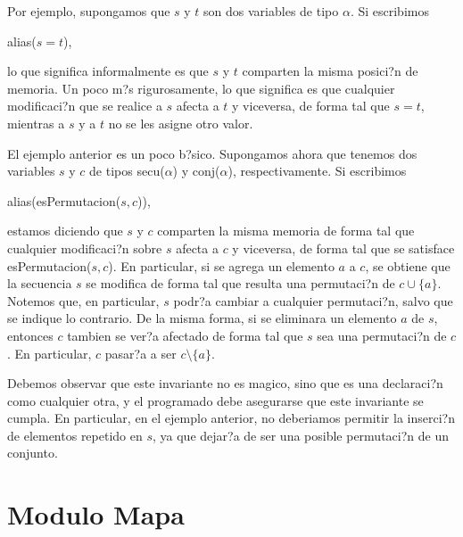 \documentclass[a4paper,10pt]{article}
\begin{document}
Por ejemplo, supongamos que $s$ y $t$ son dos variables de tipo $\alpha$.  Si escribimos
\begin{center}
  alias($s = t$),
\end{center}
lo que significa informalmente es que $s$ y $t$ comparten la misma posici?n de memoria.  Un poco m?s rigurosamente, lo que significa es que cualquier modificaci?n que se realice a $s$ afecta a $t$ y viceversa, de forma tal que $s = t$, mientras a $s$ y a $t$ no se les asigne otro valor.

El ejemplo anterior es un poco b?sico.  Supongamos ahora que tenemos dos variables $s$ y $c$ de tipos secu($\alpha$) y conj($\alpha$), respectivamente.  Si escribimos
\begin{center}
  alias(esPermutacion($s, c$)),
\end{center}
estamos diciendo que $s$ y $c$ comparten la misma memoria de forma tal que cualquier modificaci?n sobre $s$ afecta a $c$ y viceversa, de forma tal que se satisface esPermutacion($s, c$).  En particular, si se agrega un elemento $a$ a $c$, se obtiene que la secuencia $s$ se modifica de forma tal que resulta una permutaci?n de $c \cup \{a\}$.  Notemos que, en particular, $s$ podr?a cambiar a cualquier permutaci?n, salvo que se indique lo contrario.  De la misma forma, si se eliminara un elemento $a$ de $s$, entonces $c$ tambien se ver?a afectado de forma tal que $s$ sea una permutaci?n de $c$.  En particular, $c$ pasar?a a ser $c \setminus \{a\}$.

Debemos observar que este invariante no es magico, sino que es una declaraci?n como cualquier otra, y el programado debe asegurarse que este invariante se cumpla.  En particular, en el ejemplo anterior, no deberiamos permitir la inserci?n de elementos repetido en $s$, ya que dejar?a de ser una posible permutaci?n de un conjunto.

\section{Modulo Mapa}
\end{document}
